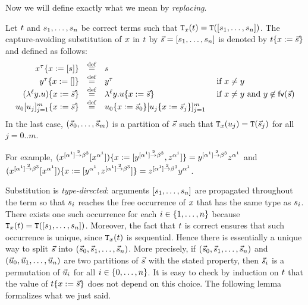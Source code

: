 Now we will define exactly what we mean by \emph{replacing}.
\begin{definition}[Substitution]
Let $t$ and $s_1,\hdots,s_n$ be correct terms such that $\mathtt{T}_{x}(t) = \mathtt{T}([s_1,\hdots,s_n])$.
The capture-avoiding substitution of $x$ in $t$ by $\vec{s} = [s_1,\hdots,s_n]$
is denoted by $t\{x := \vec{s}\}$ and defined as follows:
\[
  \begin{array}{rcll}
    x^\tau\{x := [s]\} & \overset{\mathrm{def}}{=} & s
  \\
    y^\tau\{x := []\} & \overset{\mathrm{def}}{=} & y^\tau
    & \text{ if $x \neq y$}
  \\
    (\lambda^{\ell} y. u)\{x := \vec{s}\} & \overset{\mathrm{def}}{=} &  \lambda^{\ell} y.  u\{x := \vec{s}\}
    & \text{ if $x \neq y$ and $y \not\in \mathsf{fv}({\vec{s}})$}
  \\
    u_0[u_j]_{j=1}^{m}\{x := \vec{s}\} & \overset{\mathrm{def}}{=} &
    u_0\{x := \vec{s}_0\}[u_j\{x := \vec{s}_j\}]_{j=1}^{m}
  \end{array}
\]
In the last case, $(\vec{s}_0, \hdots, \vec{s}_m)$
is a partition of $\vec{s}$
such that $\mathtt{T}_{x}(u_j) = \mathtt{T}(\vec{s}_j)$ for all $j=0..m$.
\end{definition}

For example,
$(x^{[\alpha^1] \overset{2}{\to} \beta^3}[x^{\alpha^1}])\{x := [y^{[\alpha^1] \overset{2}{\to} \beta^3},z^{\alpha^1}]\}
  = y^{[\alpha^1] \overset{2}{\to} \beta^3}z^{\alpha^1}$
and
$(x^{[\alpha^1] \overset{2}{\to} \beta^3}[x^{\alpha^1}])\{x := [y^{\alpha^1},z^{[\alpha^1] \overset{2}{\to} \beta^3}]\}
  = z^{[\alpha^1] \overset{2}{\to} \beta^3}y^{\alpha^1}$.


\begin{remark}
Substitution is {\em type-directed}: arguments $[s_1,\hdots,s_n]$
are propagated throughout the term
so that $s_i$ reaches the free occurrence of $x$
that has the same type as $s_i$.
There exists one such occurrence for each $i \in \{1, \hdots, n\}$ because
$\mathtt{T}_{x}(t) = \mathtt{T}([s_1,\hdots,s_n])$.
Moreover, the fact that $t$ is correct ensures that such occurrence is unique,
since $\mathtt{T}_{x}(t)$ is sequential.
Hence there is essentially a unique way to split $\vec{s}$
into $(\vec{s}_0, \vec{s}_1, \hdots, \vec{s}_n)$.
More precisely, if $(\vec{s}_0, \vec{s}_1, \hdots, \vec{s}_n)$
and $(\vec{u}_0, \vec{u}_1, \hdots, \vec{u}_n)$
are two partitions of $\vec{s}$ with the stated property,
then $\vec{s}_i$ is a permutation of $\vec{u}_i$ for all $i \in \{0,\hdots,n\}$.
It is easy to check by induction on $t$
that the value of $t\{x := \vec{s}\}$ does
not depend on this choice.
The following lemma formalizes what we just said.
\end{remark}


